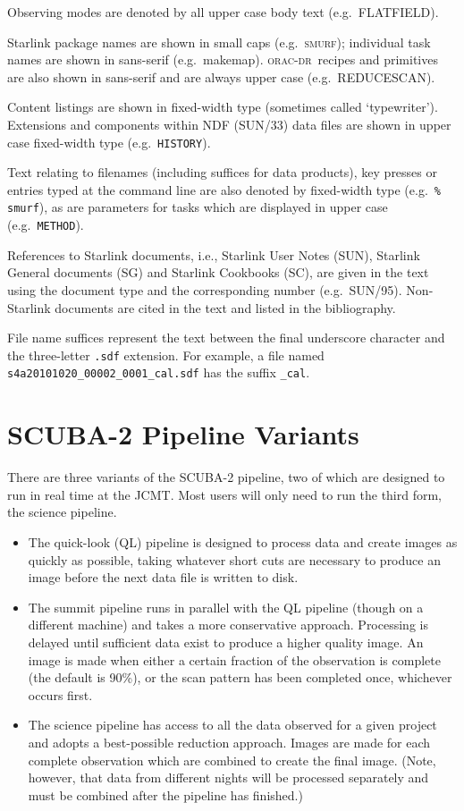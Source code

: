 \documentclass[twoside,11pt]{article}
\newcommand{\xref}[3]{#1}
\newcommand{\xlabel}[1]{}
\renewcommand{\_}{\texttt{\symbol{95}}}
\newcommand{\SMURF}{\textsc{smurf}}
\newcommand{\ndfref}{\xref{SUN/33}{sun33}{}}
\newcommand{\oracdr}{\textsc{orac-dr}}
\newcommand{\task}[1]{\textsf{#1}}
\newcommand{\makemap}{\xref{\task{makemap}}{sun258}{MAKEMAP}}
\newcommand{\aparam}[1]{\texttt{#1}}     %
\newcommand{\ndfcomp}[1]{\texttt{#1}}    %
\begin{document}
Observing modes are denoted by all upper case body text (e.g.\
FLATFIELD).

Starlink package names are shown in small caps (e.g.\ \SMURF);
individual task names are shown in sans-serif
(e.g.\ \makemap). \oracdr\ recipes and primitives are also shown in
sans-serif and are always upper case (e.g.\ \task{REDUCE\_SCAN}).

Content listings are shown in fixed-width type (sometimes called
`typewriter'). Extensions and components within NDF (\ndfref) data
files are shown in upper case fixed-width type (e.g.\
\ndfcomp{HISTORY}).

Text relating to filenames (including suffices for data products), key
presses or entries typed at the command line are also denoted by
fixed-width type (e.g.\ \texttt{\% smurf}), as are parameters for
tasks which are displayed in upper case (e.g.\ \aparam{METHOD}).

References to Starlink documents, i.e., Starlink User Notes (SUN),
Starlink General documents (SG) and Starlink Cookbooks (SC), are given
in the text using the document type and the corresponding number
(e.g.\ SUN/95). Non-Starlink documents are cited in the text and
listed in the bibliography.

File name suffices represent the text between the final underscore
character and the three-letter \verb+.sdf+ extension. For example, a
file named \verb+s4a20101020_00002_0001_cal.sdf+ has the suffix
\verb+_cal+.

\section{\xlabel{pipelines}SCUBA-2 Pipeline Variants\label{se:pipelines}}

There are three variants of the SCUBA-2 pipeline, two of which are
designed to run in real time at the JCMT. Most users will only need to
run the third form, the science pipeline.

\begin{itemize}
\item The quick-look (QL) pipeline is designed to process data and
  create images as quickly as possible, taking whatever short cuts are
  necessary to produce an image before the next data file is written
  to disk.

\item The summit pipeline runs in parallel with the QL pipeline
  (though on a different machine) and takes a more conservative
  approach. Processing is delayed until sufficient data exist to
  produce a higher quality image. An image is made when either a
  certain fraction of the observation is complete (the default is
  90\%), or the scan pattern has been completed once, whichever occurs
  first.

\item The science pipeline has access to all the data observed for a
  given project and adopts a best-possible reduction approach. Images
  are made for each complete observation which are combined to create
  the final image. (Note, however, that data from different nights
  will be processed separately and must be combined after the pipeline
  has finished.)
\end{itemize}
\end{document}

